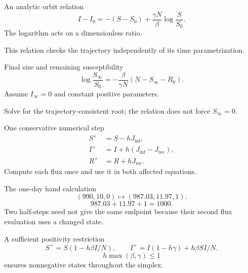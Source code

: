 \documentclass[aspectratio=169,11pt]{beamer}
\newcommand{\notestarget}{notes.pdf}\newcommand{\noteslabel}{Notes}
\begin{document}
\renewcommand{\notestarget}{notes.pdf\#note-an-invariant-and-the-final-size-relation}
\begin{frame}[t,fragile,label=slide-an-analytic-orbit-relation]{An analytic orbit relation}
\[I-I_0=-(S-S_0)+\frac{\gamma N}{\beta}\log\frac S{S_0}.\]\pause{} The logarithm acts on a dimensionless ratio.\par\medskip This relation checks the trajectory independently of its time parametrization.
\end{frame}
\renewcommand{\notestarget}{notes.pdf\#note-an-invariant-and-the-final-size-relation}
\begin{frame}[t,fragile,label=slide-final-size-and-remaining-susceptibility]{Final size and remaining susceptibility}
\[\log\frac{S_\infty}{S_0}=-\frac\beta{\gamma N}(N-S_\infty-R_0).\]\pause{} Assume $I_\infty=0$ and constant positive parameters.\par\medskip Solve for the trajectory-consistent root; the relation does not force $S_\infty=0$.
\end{frame}
\renewcommand{\notestarget}{notes.pdf\#note-a-conservative-euler-step-and-its-restrictions}
\begin{frame}[t,fragile,label=slide-one-conservative-numerical-step]{One conservative numerical step}
\[\begin{aligned}S^+&=S-hJ_{\mathrm{inf}},\\I^+&=I+h(J_{\mathrm{inf}}-J_{\mathrm{rec}}),\\R^+&=R+hJ_{\mathrm{rec}}.\end{aligned}\]\pause{} Compute each flux once and use it in both affected equations.
\end{frame}
\renewcommand{\notestarget}{notes.pdf\#note-a-conservative-euler-step-and-its-restrictions}
\begin{frame}[t,fragile,label=slide-the-one-day-hand-calculation]{The one-day hand calculation}
\[(990,10,0)\longmapsto(987.03,11.97,1).\]\pause{}\[987.03+11.97+1=1000.\] Two half-steps need not give the same endpoint because their second flux evaluation uses a changed state.
\end{frame}
\renewcommand{\notestarget}{notes.pdf\#note-a-conservative-euler-step-and-its-restrictions}
\begin{frame}[t,fragile,label=slide-a-sufficient-positivity-restriction]{A sufficient positivity restriction}
\[S^+=S(1-h\beta I/N),\qquad I^+=I(1-h\gamma)+h\beta SI/N.\]\pause{}\[h\max(\beta,\gamma)\leq1\] ensures nonnegative states throughout the simplex.
\end{frame}
\end{document}
